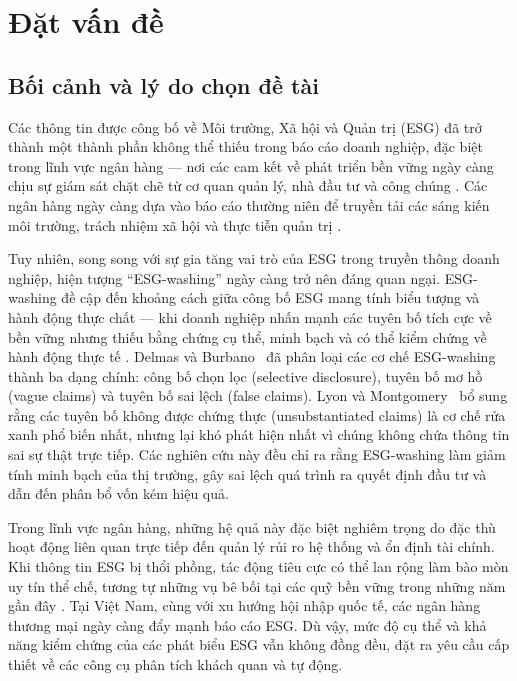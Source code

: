 \chapter{Đặt vấn đề}

\section{Bối cảnh và lý do chọn đề tài}
Các thông tin được công bố về Môi trường, Xã hội và Quản trị (ESG) đã trở thành một thành phần không thể thiếu trong báo cáo doanh nghiệp, đặc biệt trong lĩnh vực ngân hàng --- nơi các cam kết về phát triển bền vững ngày càng chịu sự giám sát chặt chẽ từ cơ quan quản lý, nhà đầu tư và công chúng \cite{buchetti2025literature, lagasio2024esg}. Các ngân hàng ngày càng dựa vào báo cáo thường niên để truyền tải các sáng kiến môi trường, trách nhiệm xã hội và thực tiễn quản trị \cite{buchetti2025literature}.

Tuy nhiên, song song với sự gia tăng vai trò của ESG trong truyền thông doanh nghiệp, hiện tượng ``ESG-washing'' ngày càng trở nên đáng quan ngại. ESG-washing đề cập đến khoảng cách giữa công bố ESG mang tính biểu tượng và hành động thực chất --- khi doanh nghiệp nhấn mạnh các tuyên bố tích cực về bền vững nhưng thiếu bằng chứng cụ thể, minh bạch và có thể kiểm chứng về hành động thực tế \cite{florstedt2025detecting, marquis2016scrutiny}. Delmas và Burbano~\cite{delmas2011drivers} đã phân loại các cơ chế ESG-washing thành ba dạng chính: công bố chọn lọc (selective disclosure), tuyên bố mơ hồ (vague claims) và tuyên bố sai lệch (false claims). Lyon và Montgomery~\cite{lyon2015means} bổ sung rằng các tuyên bố không được chứng thực (unsubstantiated claims) là cơ chế rửa xanh phổ biến nhất, nhưng lại khó phát hiện nhất vì chúng không chứa thông tin sai sự thật trực tiếp. Các nghiên cứu này đều chỉ ra rằng ESG-washing làm giảm tính minh bạch của thị trường, gây sai lệch quá trình ra quyết định đầu tư và dẫn đến phân bổ vốn kém hiệu quả.

Trong lĩnh vực ngân hàng, những hệ quả này đặc biệt nghiêm trọng do đặc thù hoạt động liên quan trực tiếp đến quản lý rủi ro hệ thống và ổn định tài chính. Khi thông tin ESG bị thổi phồng, tác động tiêu cực có thể lan rộng làm bào mòn uy tín thể chế, tương tự những vụ bê bối tại các quỹ bền vững trong những năm gần đây \cite{lipenkova2023detecting}. Tại Việt Nam, cùng với xu hướng hội nhập quốc tế, các ngân hàng thương mại ngày càng đẩy mạnh báo cáo ESG. Dù vậy, mức độ cụ thể và khả năng kiểm chứng của các phát biểu ESG vẫn không đồng đều, đặt ra yêu cầu cấp thiết về các công cụ phân tích khách quan và tự động.

